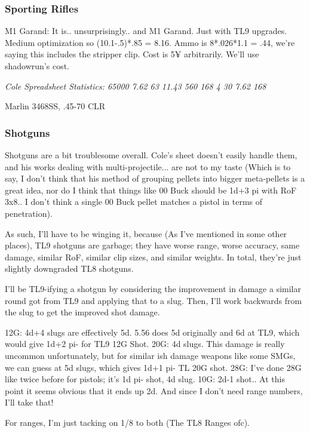 \begin{multicols*}{2}
	\subsubsection{Sporting Rifles}
	
	M1 Garand: It is.. unsurprisingly.. and M1 Garand. Just with TL9 upgrades. Medium optimization so (10.1-.5)*.85 = 8.16. Ammo is 8*.026*1.1 = .44, we're saying this includes the stripper clip. Cost is 5¥ arbitrarily. We'll use shadowrun's cost.
	
	\textit{\textcolor{OliveGreen}{Cole Spreadsheet Statistics: 65000 7.62 63 11.43 560 168 4 30 7.62 168}}
	
	
	Marlin 3468SS, .45-70 CLR
	
	
	\subsubsection{Shotguns}
	
	Shotguns are a bit troublesome overall. Cole's sheet doesn't easily handle them, and his works dealing with multi-projectile... are not to my taste (Which is to say, I don't think that his method of grouping pellets into bigger meta-pellets is a great idea, nor do I think that things like 00 Buck should be 1d+3 pi with RoF 3x8.. I don't think a single 00 Buck pellet matches a pistol in terms of penetration). 
	
	As such, I'll have to be winging it, because (As I've mentioned in some other places), TL9 shotguns are garbage; they have worse range, worse accuracy, same damage, similar RoF, similar clip sizes, and similar weights. In total, they're just slightly downgraded TL8 shotguns. 
	
	I'll be TL9-ifying a shotgun by considering the improvement in damage a similar round got from TL9 and applying that to a slug. Then, I'll work backwards from the slug to get the improved shot damage. 
	
	12G: 4d+4 slugs are effectively 5d. 5.56 does 5d originally and 6d at TL9, which would give 1d+2 pi- for TL9 12G Shot.
	20G: 4d slugs. This damage is really uncommon unfortunately, but for similar ish damage weapons like some SMGs, we can guess at 5d slugs, which gives 1d+1 pi- TL 20G shot.
	28G: I've done 28G like twice before for pistols; it's 1d pi- shot, 4d slug.
	10G: 2d-1 shot.. At this point it seems obvious that it ends up 2d. And since I don't need range numbers, I'll take that!
	
	For ranges, I'm just tacking on 1/8 to both (The TL8 Ranges ofc).
	

\end{multicols*}
